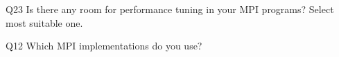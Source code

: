 \begin{description}%
\item{Q23} Is there any room for performance tuning in your MPI programs? Select most suitable one.%
\item{Q12} Which MPI implementations do you use?%
\end{description}%
